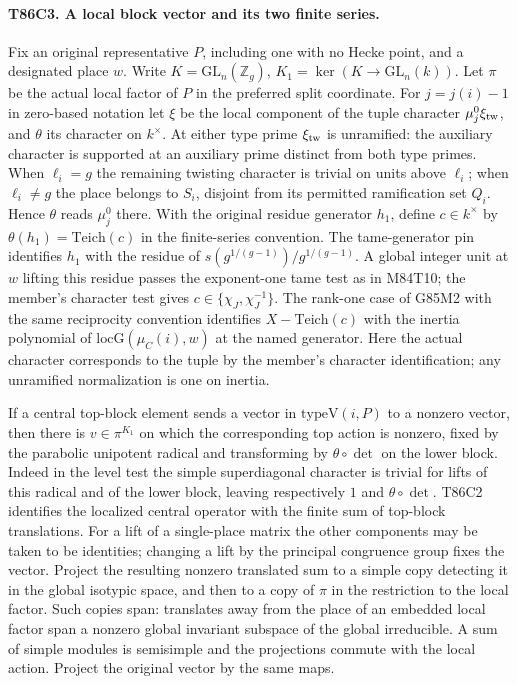 \paragraph{T86C3. A local block vector and its two finite series.}
Fix an original representative $P$, including one with no Hecke
point, and a designated place $w$. Write $K=\mathrm{GL}_n(\mathbb
Z_g)$, $K_1=\ker(K\to\mathrm{GL}_n(k))$. Let $\pi$ be the
actual local factor of $P$ in the preferred split coordinate.
For $j=j(i)-1$ in zero-based notation let $\xi$ be the local
component of the tuple character $\mu_j^0\xi_{\rm tw}$, and
$\theta$ its character on $k^\times$. At either type prime
$\xi_{\rm tw}$ is unramified: the auxiliary character is supported
at an auxiliary prime distinct from both type primes. When
$\ell_i=g$ the remaining twisting character is trivial on units
above $\ell_i$; when $\ell_i\ne g$ the place belongs to $S_i$,
disjoint from its permitted ramification set $Q_i$. Hence
$\theta$ reads $\mu_j^0$ there. With the original residue
generator $h_1$, define $c\in k^\times$ by
$\theta(h_1)=\mathrm{Teich}(c)$ in the finite-series convention.
The tame-generator pin identifies $h_1$ with the residue of
$s(g^{1/(g-1)})/g^{1/(g-1)}$. A global integer unit at $w$
lifting this residue passes the exponent-one tame test as in
M84T10; the member's character test gives
$c\in\{\chi_J,\chi_J^{-1}\}$. The rank-one case of G85M2
with the same reciprocity convention identifies
$X-\mathrm{Teich}(c)$ with the inertia polynomial of
$\mathrm{locG}(\mu_C(i),w)$ at the named generator. Here the
actual character corresponds to the tuple by the member's
character identification; any unramified normalization is one on
inertia.

If a central top-block element sends a vector in $\mathrm{typeV}(i,P)$
to a nonzero vector, then there is $v\in\pi^{K_1}$ on which the
corresponding top action is nonzero, fixed by the parabolic
unipotent radical and transforming by $\theta\circ\det$ on the
lower block. Indeed in the level test the simple superdiagonal
character is trivial for lifts of this radical and of the lower
block, leaving respectively $1$ and $\theta\circ\det$.
T86C2 identifies the localized central operator with the finite
sum of top-block translations. For a lift of a single-place matrix
the other components may be taken to be identities; changing a
lift by the principal congruence group fixes the vector. Project
the resulting nonzero translated sum to a simple copy detecting
it in the global isotypic space, and then to a copy of $\pi$ in
the restriction to the local factor. Such copies span: translates
away from the place of an embedded local factor span a nonzero
global invariant subspace of the global irreducible. A sum of
simple modules is semisimple and the projections commute with the
local action. Project the original vector by the same maps.

